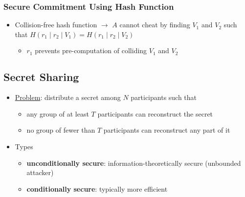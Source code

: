 \documentclass[final]{article}
\begin{document}
\subsubsection*{Secure Commitment Using Hash Function}
\begin{itemize}[nosep]
    \item Collision-free hash function $\rightarrow$ $A$ cannot cheat by finding $V_1$ and $V_2$ such that $H(r_1 \mid r_2 \mid V_1) = H(r_1 \mid r_2 \mid V_2)$
          \begin{itemize}
              \item $r_1$ prevents pre-computation of colliding $V_1$ and $V_2$
          \end{itemize}
\end{itemize}
\subsection{Secret Sharing}
\begin{itemize}[nosep]
    \item \underline{Problem}: distribute a secret among $N$ participants such that
          \begin{itemize}[nosep]
              \item any group of at least $T$ participants can reconstruct the secret
              \item no group of fewer than $T$ participants can reconstruct any part of it
          \end{itemize}
    \item Types
          \begin{itemize}[nosep]
              \item \textbf{unconditionally secure}: information-theoretically secure (unbounded attacker)
              \item \textbf{conditionally secure}: typically more efficient
          \end{itemize}
\end{itemize}
\end{document}
